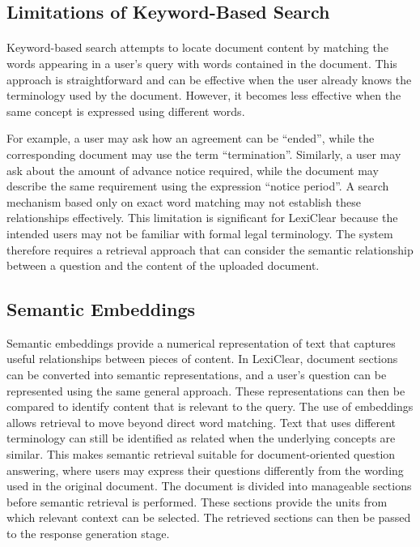 \documentclass[12pt,a4paper,oneside]{report}
\begin{document}
\subsection{Limitations of Keyword-Based Search}

\paragraph{} Keyword-based search attempts to locate document content by matching the
words appearing in a user's query with words contained in the document.
This approach is straightforward and can be effective when the user already
knows the terminology used by the document. However, it becomes less
effective when the same concept is expressed using different words.

For example, a user may ask how an agreement can be ``ended'', while the
corresponding document may use the term ``termination''. Similarly, a user
may ask about the amount of advance notice required, while the document may
describe the same requirement using the expression ``notice period''. A
search mechanism based only on exact word matching may not establish these
relationships effectively. This limitation is significant for LexiClear because the intended users may
not be familiar with formal legal terminology. The system therefore requires
a retrieval approach that can consider the semantic relationship between a
question and the content of the uploaded document.

\subsection{Semantic Embeddings}

Semantic embeddings provide a numerical representation of text that captures
useful relationships between pieces of content. In LexiClear, document
sections can be converted into semantic representations, and a user's
question can be represented using the same general approach. These
representations can then be compared to identify content that is relevant to
the query. The use of embeddings allows retrieval to move beyond direct word matching.
Text that uses different terminology can still be identified as related when
the underlying concepts are similar. This makes semantic retrieval suitable
for document-oriented question answering, where users may express their
questions differently from the wording used in the original document. The document is divided into manageable sections before semantic retrieval
is performed. These sections provide the units from which relevant context
can be selected. The retrieved sections can then be passed to the response
generation stage.
\end{document}
